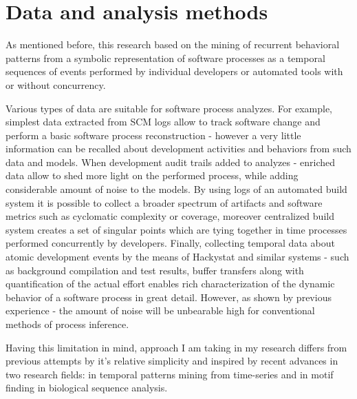 \documentclass{sig-alternate}
\begin{document}
\section{Data and analysis methods}
As mentioned before, this research based on the mining of recurrent behavioral patterns from a symbolic representation of software processes as a temporal sequences of events performed by individual developers or automated tools with or without concurrency. 

Various types of data are suitable for software process analyzes. For example, simplest data extracted from SCM logs allow to track software change and perform a basic software process reconstruction - however a very little information can be recalled about development activities and behaviors from such data and models. When development audit trails added to analyzes - enriched data allow to shed more light on the performed process, while adding considerable amount of noise to the models. By using logs of an automated build system it is possible to collect a broader spectrum of artifacts and software metrics such as cyclomatic complexity or coverage, moreover centralized build system creates a set of singular points which are tying together in time processes performed concurrently by developers. Finally, collecting temporal data about atomic development events by the means of Hackystat and similar systems - such as background compilation and test results, buffer transfers along with quantification of the actual effort enables rich characterization of the dynamic behavior of a software process in great detail. However, as shown by previous experience - the amount of noise will be unbearable high for conventional methods of process inference.

Having this limitation in mind, approach I am taking in my research differs from previous attempts by it's relative simplicity and inspired by recent advances in two research fields: in temporal patterns mining from time-series and in motif finding in biological sequence analysis. 
\end{document}
